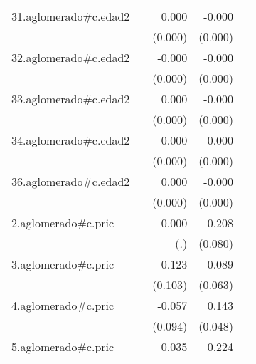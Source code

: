 {\begin{longtable}{l*{4}{D{.}{.}{-1}}}
\addlinespace
31.aglomerado#c.edad2&                     &       0.000         &      -0.000\sym{*}  &                     \\
            &                     &     (0.000)         &     (0.000)         &                     \\
\addlinespace
32.aglomerado#c.edad2&                     &      -0.000         &      -0.000\sym{***}&                     \\
            &                     &     (0.000)         &     (0.000)         &                     \\
\addlinespace
33.aglomerado#c.edad2&                     &       0.000         &      -0.000\sym{***}&                     \\
            &                     &     (0.000)         &     (0.000)         &                     \\
\addlinespace
34.aglomerado#c.edad2&                     &       0.000         &      -0.000\sym{**} &                     \\
            &                     &     (0.000)         &     (0.000)         &                     \\
\addlinespace
36.aglomerado#c.edad2&                     &       0.000         &      -0.000         &                     \\
            &                     &     (0.000)         &     (0.000)         &                     \\
\addlinespace
2.aglomerado#c.pric&                     &       0.000         &       0.208\sym{**} &                     \\
            &                     &         (.)         &     (0.080)         &                     \\
\addlinespace
3.aglomerado#c.pric&                     &      -0.123         &       0.089         &                     \\
            &                     &     (0.103)         &     (0.063)         &                     \\
\addlinespace
4.aglomerado#c.pric&                     &      -0.057         &       0.143\sym{**} &                     \\
            &                     &     (0.094)         &     (0.048)         &                     \\
\addlinespace
5.aglomerado#c.pric&                     &       0.035         &       0.224\sym{***}&                     \\

\end{longtable}}
